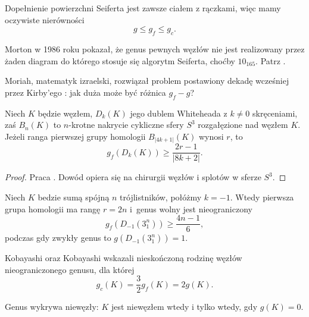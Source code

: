 Dopełnienie powierzchni Seiferta jest zawsze ciałem z rączkami, więc mamy oczywiste nierówności
\begin{equation}
	g \le g_f \le g_c.
\end{equation}

Morton w 1986 roku pokazał, że genus pewnych węzłów nie jest realizowany przez żaden diagram do którego stosuje się algorytm Seiferta, choćby $10_{165}$.
Patrz \cite{morton86}.

Moriah, matematyk izraelski, rozwiązał problem postawiony dekadę wcześniej przez Kirby'ego \cite{kirby78}: jak duża może być różnica $g_f - g$?

\begin{proposition}
    Niech $K$ będzie węzłem, $D_k(K)$ jego dublem Whiteheada z $k \neq 0$ skręceniami, zaś $B_n(K)$ to $n$-krotne nakrycie cykliczne sfery $S^3$ rozgałęzione nad węzłem $K$.
    Jeżeli ranga pierwszej grupy homologii $B_{|4k+1|}(K)$ wynosi $r$, to
    \begin{equation}
        g_f(D_k(K)) \ge \frac {2r-1} {|8k+2|}.
    \end{equation}
\end{proposition}

\begin{proof}
    Praca \cite{moriah87}.
    Dowód opiera się na chirurgii węzłów i splotów w sferze $S^3$.
\end{proof}

\begin{corollary}
    Niech $K$ bedzie sumą spójną $n$ trójlistników, połóżmy $k = -1$.
    Wtedy pierwsza grupa homologii ma rangę $r = 2n$ i~genus wolny jest nieograniczony
    \begin{equation}
        g_f(D_{-1}(3_1^n)) \ge \frac {4n-1} {6},
    \end{equation}
    podczas gdy zwykły genus to $g(D_{-1}(3_1^n)) = 1$.
\end{corollary}

Kobayashi oraz Kobayashi \cite{kobayashi96} wskazali nieskończoną rodzinę węzłów nieograniczonego genusu, dla której
\begin{equation}
	g_c(K) = \frac 32 g_f(K) = 2g(K).
\end{equation}

\begin{proposition}
    \label{prp:genus_detects_unknot}
    Genus wykrywa niewęzły: $K$ jest niewęzłem wtedy i tylko wtedy, gdy $g(K) = 0$.
\end{proposition}

